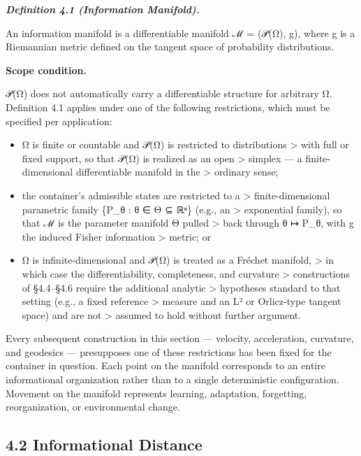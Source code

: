 \documentclass[
]{article}
\begin{document}
\emph{\textbf{Definition 4.1 (Information Manifold).}}

An information manifold is a differentiable manifold ℳ = (𝒫(Ω), g),
where g is a Riemannian metric defined on the tangent space of
probability distributions.

\textbf{Scope condition.}

𝒫(Ω) does not automatically carry a differentiable structure for
arbitrary Ω. Definition 4.1 applies under one of the following
restrictions, which must be specified per application:

\begin{itemize}
\item
  Ω is finite or countable and 𝒫(Ω) is restricted to distributions
  \textgreater{} with full or fixed support, so that 𝒫(Ω) is realized as
  an open \textgreater{} simplex --- a finite-dimensional differentiable
  manifold in the \textgreater{} ordinary sense;
\item
  the container's admissible states are restricted to a \textgreater{}
  finite-dimensional parametric family \{P\_θ : θ ∈ Θ ⊆ ℝⁿ\} (e.g., an
  \textgreater{} exponential family), so that ℳ is the parameter
  manifold Θ pulled \textgreater{} back through θ ↦ P\_θ, with g the
  induced Fisher information \textgreater{} metric; or
\item
  Ω is infinite-dimensional and 𝒫(Ω) is treated as a Fréchet manifold,
  \textgreater{} in which case the differentiability, completeness, and
  curvature \textgreater{} constructions of §4.4--§4.6 require the
  additional analytic \textgreater{} hypotheses standard to that setting
  (e.g., a fixed reference \textgreater{} measure and an L² or
  Orlicz-type tangent space) and are not \textgreater{} assumed to hold
  without further argument.
\end{itemize}

Every subsequent construction in this section --- velocity,
acceleration, curvature, and geodesics --- presupposes one of these
restrictions has been fixed for the container in question. Each point on
the manifold corresponds to an entire informational organization rather
than to a single deterministic configuration. Movement on the manifold
represents learning, adaptation, forgetting, reorganization, or
environmental change.

\hypertarget{informational-distance}{%
\subsection{4.2 Informational Distance}\label{informational-distance}}
\end{document}
